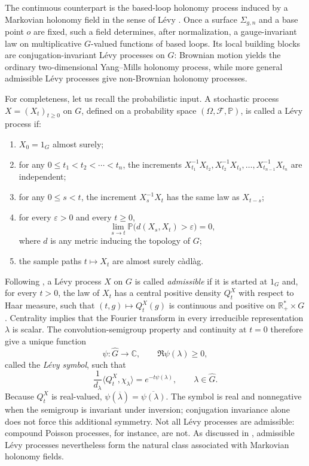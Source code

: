 \documentclass[11pt,a4paper,reqno]{article}
\theoremstyle{definition}
\theoremstyle{remark}
\newcommand\R{\mathbb{R}}
\newcommand\C{\mathbb{C}}
\begin{document}
The continuous counterpart is the based-loop holonomy process induced by a Markovian holonomy field in the sense of L\'evy \cite{Lev03,Lev10}. Once a surface $\Sigma_{g,n}$ and a base point $o$ are fixed, such a field determines, after normalization, a gauge-invariant law on multiplicative $G$-valued functions of based loops. Its local building blocks are conjugation-invariant L\'evy processes on $G$: Brownian motion yields the ordinary two-dimensional Yang--Mills holonomy process, while more general admissible L\'evy processes give non-Brownian holonomy processes.

For completeness, let us recall the probabilistic input. A stochastic process $X=(X_t)_{t\geq0}$ on $G$, defined on a probability space $(\Omega,\mathcal F,\mathbb P)$, is called a L\'evy process if:
\begin{enumerate}
\item $X_0=1_G$ almost surely;
\item for any $0\leq t_1<t_2<\cdots<t_n$, the increments $X_{t_1}^{-1}X_{t_2},X_{t_2}^{-1}X_{t_3},\ldots,X_{t_{n-1}}^{-1}X_{t_n}$ are independent;
\item for any $0\leq s<t$, the increment $X_s^{-1}X_t$ has the same law as $X_{t-s}$;
\item for every $\varepsilon>0$ and every $t\geq0$,
\[
 \lim_{s\to t}\mathbb P\big(d(X_s,X_t)>\varepsilon\big)=0,
\]
where $d$ is any metric inducing the topology of $G$;
\item the sample paths $t\mapsto X_t$ are almost surely c\`adl\`ag.
\end{enumerate}

Following \cite{Lev10}, a L\'evy process $X$ on $G$ is called \emph{admissible} if it is started at $1_G$ and, for every $t>0$, the law of $X_t$ has a central positive density $Q_t^X$ with respect to Haar measure, such that $(t,g)\mapsto Q_t^X(g)$ is continuous and positive on $\R_+^*\times G$. Centrality implies that the Fourier transform in every irreducible representation $\lambda$ is scalar. The convolution-semigroup property and continuity at $t=0$ therefore give a unique function
\[
 \psi:\widehat G\longrightarrow\C,
 \qquad \Re\psi(\lambda)\geq0,
\]
called the \emph{L\'evy symbol}, such that
\[
 \frac{1}{d_\lambda}\langle Q_t^X,\chi_\lambda\rangle=e^{-t\psi(\lambda)},
 \qquad \lambda\in\widehat G.
\]
Because $Q_t^X$ is real-valued, $\psi(\overline\lambda)=\overline{\psi(\lambda)}$. The symbol is real and nonnegative when the semigroup is invariant under inversion; conjugation invariance alone does not force this additional symmetry. Not all L\'evy processes are admissible: compound Poisson processes, for instance, are not. As discussed in \cite{Lev10}, admissible L\'evy processes nevertheless form the natural class associated with Markovian holonomy fields.
\end{document}
